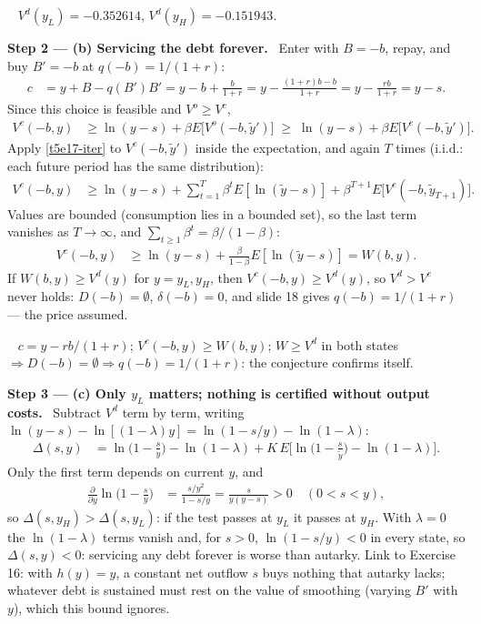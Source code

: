 \documentclass[11pt,a4paper]{article}
\newcommand{\step}[2]{\par\medskip\noindent\textbf{Step #1 --- #2.}~}
\newcommand{\answer}[1]{\par\smallskip\noindent\fbox{\textbf{Answer #1.}}~}
\begin{document}
\answer{(a)} $V^d(y_L)=-0.352614$, $V^d(y_H)=-0.151943$.

\step{2}{(b) Servicing the debt forever} Enter with $B=-b$, repay, and buy $B'=-b$ at $q(-b)=1/(1+r)$:
\begin{align}
  c &= y+B-q(B')B' = y-b+\frac{b}{1+r} = y-\frac{(1+r)b-b}{1+r} = y-\frac{rb}{1+r} = y-s. \nonumber
\end{align}
Since this choice is feasible and $V^o\ge V^c$,
\begin{align}
  V^c(-b,y) &\ge \ln(y-s)+\beta E\big[V^o(-b,\tilde y')\big] \;\ge\; \ln(y-s)+\beta E\big[V^c(-b,\tilde y')\big]. \label{t5e17-iter}
\end{align}
Apply \eqref{t5e17-iter} to $V^c(-b,\tilde y')$ inside the expectation, and again $T$ times (i.i.d.: each future period has the same distribution):
\begin{align}
  V^c(-b,y) &\ge \ln(y-s)+\sum_{t=1}^{T}\beta^t E[\ln(\tilde y-s)] + \beta^{T+1}E\big[V^c(-b,\tilde y_{T+1})\big]. \nonumber
\end{align}
Values are bounded (consumption lies in a bounded set), so the last term vanishes as $T\to\infty$, and $\sum_{t\ge1}\beta^t=\beta/(1-\beta)$:
\begin{align}
  V^c(-b,y) &\ge \ln(y-s)+\frac{\beta}{1-\beta}E[\ln(\tilde y-s)] = W(b,y). \label{t5e17-W}
\end{align}
If $W(b,y)\ge V^d(y)$ for $y=y_L,y_H$, then $V^c(-b,y)\ge V^d(y)$, so $V^d>V^c$ never holds: $D(-b)=\emptyset$, $\delta(-b)=0$, and slide 18 gives $q(-b)=1/(1+r)$ --- the price assumed.

\answer{(b)} $c=y-rb/(1+r)$; $V^c(-b,y)\ge W(b,y)$; $W\ge V^d$ in both states $\Rightarrow D(-b)=\emptyset\Rightarrow q(-b)=1/(1+r)$: the conjecture confirms itself.

\step{3}{(c) Only $y_L$ matters; nothing is certified without output costs} Subtract $V^d$ term by term, writing $\ln(y-s)-\ln[(1-\lambda)y]=\ln(1-s/y)-\ln(1-\lambda)$:
\begin{align}
  \Delta(s,y) &= \ln\!\Big(1-\frac sy\Big)-\ln(1-\lambda) + K\,E\Big[\ln\!\Big(1-\frac s{\tilde y}\Big)-\ln(1-\lambda)\Big]. \label{t5e17-Delta}
\end{align}
Only the first term depends on current $y$, and
\begin{align}
  \frac{\partial}{\partial y}\ln\!\Big(1-\frac sy\Big) &= \frac{s/y^2}{1-s/y} = \frac{s}{y(y-s)} > 0 \quad (0<s<y), \nonumber
\end{align}
so $\Delta(s,y_H)>\Delta(s,y_L)$: if the test passes at $y_L$ it passes at $y_H$. With $\lambda=0$ the $\ln(1-\lambda)$ terms vanish and, for $s>0$, $\ln(1-s/y)<0$ in every
state, so $\Delta(s,y)<0$: servicing any debt forever is worse than autarky. Link to Exercise 16: with $h(y)=y$, a constant net outflow $s$ buys nothing that autarky
lacks; whatever debt is sustained must rest on the value of smoothing (varying $B'$ with $y$), which this bound ignores.
\end{document}
